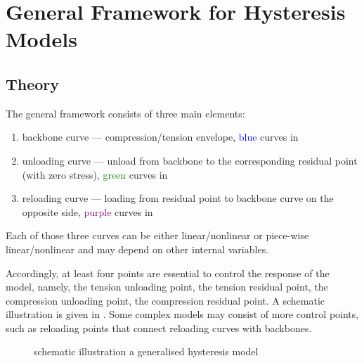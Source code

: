 \section{General Framework for Hysteresis Models}
\subsection{Theory}
The general framework consists of three main elements:
\begin{enumerate}
\item backbone curve --- compression/tension envelope, \textcolor{blue}{blue} curves in 
\item unloading curve --- unload from backbone to the corresponding residual point (with zero stress), \textcolor{green}{green} curves in 
\item reloading curve --- loading from residual point to backbone curve on the opposite side, \textcolor{purple}{purple} curves in 
\end{enumerate}
Each of those three curves can be either linear/nonlinear or piece-wise linear/nonlinear and may depend on other internal variables.

Accordingly, at least four points are essential to control the response of the model, namely, the tension unloading point, the tension residual point, the compression unloading point, the compression residual point. A schematic illustration is given in . Some complex models may consist of more control points, such as reloading points that connect reloading curves with backbones.
\begin{figure}[ht]
\centering\footnotesize
{}
\caption{schematic illustration a generalised hysteresis model}\label{fig:general_hysteresis}
\end{figure}

